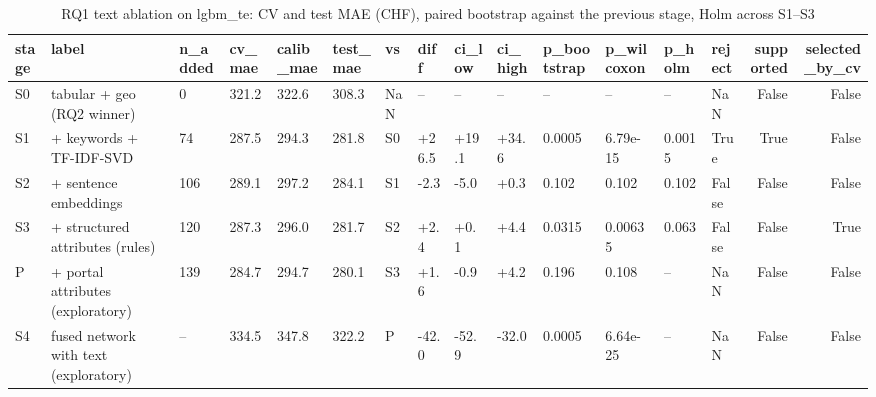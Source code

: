 \begin{table}
\caption{RQ1 text ablation on lgbm_te: CV and test MAE (CHF), paired bootstrap against the previous stage, Holm across S1--S3}
\label{tab:rq1_text_ablation}
\begin{tabular}{llllllllllllllrr}
\toprule
stage & label & n_added & cv_mae & calib_mae & test_mae & vs & diff & ci_low & ci_high & p_bootstrap & p_wilcoxon & p_holm & reject & supported & selected_by_cv \\
\midrule
S0 & tabular + geo (RQ2 winner) & 0 & 321.2 & 322.6 & 308.3 & NaN & – & – & – & – & – & – & NaN & False & False \\
S1 & + keywords + TF-IDF-SVD & 74 & 287.5 & 294.3 & 281.8 & S0 & +26.5 & +19.1 & +34.6 & 0.0005 & 6.79e-15 & 0.0015 & True & True & False \\
S2 & + sentence embeddings & 106 & 289.1 & 297.2 & 284.1 & S1 & -2.3 & -5.0 & +0.3 & 0.102 & 0.102 & 0.102 & False & False & False \\
S3 & + structured attributes (rules) & 120 & 287.3 & 296.0 & 281.7 & S2 & +2.4 & +0.1 & +4.4 & 0.0315 & 0.00635 & 0.063 & False & False & True \\
P & + portal attributes (exploratory) & 139 & 284.7 & 294.7 & 280.1 & S3 & +1.6 & -0.9 & +4.2 & 0.196 & 0.108 & – & NaN & False & False \\
S4 & fused network with text (exploratory) & – & 334.5 & 347.8 & 322.2 & P & -42.0 & -52.9 & -32.0 & 0.0005 & 6.64e-25 & – & NaN & False & False \\
\bottomrule
\end{tabular}
\end{table}

